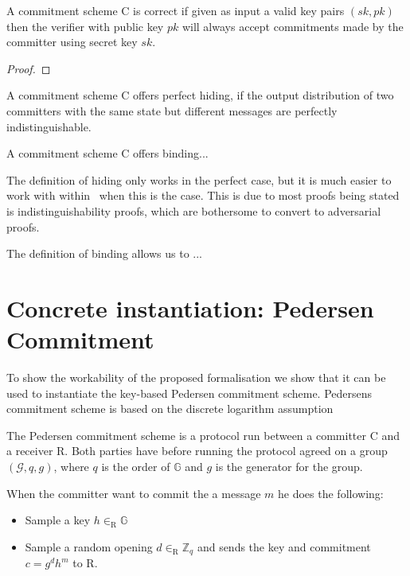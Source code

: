 \begin{lemma}
  A commitment scheme C is correct if given as input a valid key pairs
  $(sk, pk)$ then the verifier with public key $pk$ will always accept
  commitments made by the committer using secret key $sk$.
\end{lemma}
\begin{proof}

\end{proof}

\begin{definition}
  \label{def:commitment:perfect-hiding}
  A commitment scheme C offers perfect hiding, if the output distribution of two
  committers with the same state but different messages are perfectly
  indistinguishable.

\end{definition}

\begin{definition}
  \label{def:commitment:alt-binding}
  A commitment scheme C offers binding...
\end{definition}

The definition of hiding only works in the perfect case, but it is much easier
to work with within \easycrypt\  when this is the case. This is due to most
proofs being stated is indistinguishability proofs, which are bothersome to
convert to adversarial proofs.

The definition of binding allows us to ...


\section{Concrete instantiation: Pedersen Commitment}
\label{sec:pedersen}

To show the workability of the proposed formalisation we show that it can be
used to instantiate the key-based Pedersen commitment scheme. Pedersens
commitment scheme is based on the discrete logarithm assumption


The Pedersen commitment scheme is a protocol run between a committer C and a receiver R. Both parties have before running the protocol agreed on a group $(\mathcal{G}, q, g)$, where $q$ is the order of $\mathbb{G}$ and $g$ is the generator for the group.

When the committer want to commit the a message $m$ he does the following:
\begin{itemize}
  \item Sample a key $h \in_{\text{R}} \mathbb{G}$
  \item Sample a random opening $d \in_{\text{R}} \mathbb{Z}_{q}$ and sends the key and commitment $c = g^{d}h^{m}$ to R.
\end{itemize}

